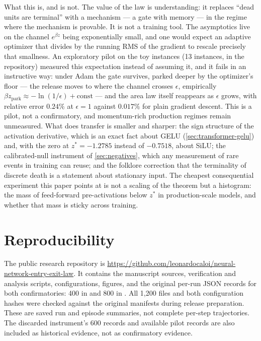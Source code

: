 \documentclass[11pt]{article}
\theoremstyle{definition}
\theoremstyle{remark}
\begin{document}
What this is, and is not. The value of the law is understanding: it replaces
``dead units are terminal'' with a mechanism --- a gate with memory --- in the
regime where the mechanism is provable. It is not a training tool. The
asymptotics live on the channel $e^{\beta z}$ being exponentially small, and one
would expect an adaptive optimizer that divides by the running RMS of the
gradient to rescale precisely that smallness. An exploratory pilot on the toy
instances (13 instances,  in the repository) measured
this expectation instead of assuming it, and it fails in an instructive way:
under Adam the gate survives, parked deeper by the optimizer's floor --- the
release moves to where the channel crosses $\epsilon$, empirically
$\beta z_{\mathrm{park}}\approx-\ln(1/\epsilon)+\mathrm{const}$ --- and the
area law itself reappears as $\epsilon$ grows, with relative error $0.24\%$ at
$\epsilon=1$ against $0.017\%$ for plain gradient descent. This is a pilot,
not a confirmatory, and momentum-rich production regimes remain unmeasured. What does
transfer is smaller and sharper: the sign structure of the activation
derivative, which is an exact fact about GELU (\cref{sec:transformer-gelu})
and, with the zero at $z^\ast=-1.2785$ instead of $-0.7518$, about SiLU; the
calibrated-null instrument of \cref{sec:negatives}, which any measurement of
rare events in training can reuse; and the folklore correction that the
terminality of discrete death is a statement about stationary input. The
cheapest consequential experiment this paper points at is not a scaling of the
theorem but a histogram: the mass of feed-forward pre-activations below
$z^\ast$ in production-scale models, and whether that mass is sticky across
training.

\section{Reproducibility}\label{sec:repro}

The public research repository is
\url{https://github.com/leonardocaloi/neural-network-entry-exit-law}.
It contains the manuscript sources, verification and analysis scripts,
configurations, figures, and the original per-run JSON records for both
confirmatories: 400 in  and 800 in
. All 1,200 files and both configuration hashes
were checked against the original manifests during release preparation.
These are saved run and episode summaries, not complete per-step trajectories.
The discarded instrument's 600 records and available pilot records are also
included as historical evidence, not as confirmatory evidence.
\end{document}
